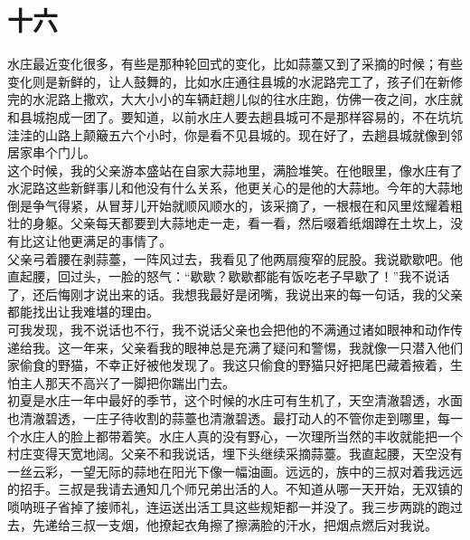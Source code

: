 \fancyhead[RO]{\thepage} %
\fancyhead[LE]{\thepage} %
\fancyfoot[LE,RO]{}
\fancyfoot[LO,CE]{}
\fancyfoot[CO,RE]{}
\chapter*{十六}
水庄最近变化很多，有些是那种轮回式的变化，比如蒜薹又到了采摘的时候；有些变化则是新鲜的，让人鼓舞的，比如水庄通往县城的水泥路完工了，孩子们在新修完的水泥路上撒欢，大大小小的车辆赶趟儿似的往水庄跑，仿佛一夜之间，水庄就和县城抱成一团了。要知道，以前水庄人要去趟县城可不是那样容易的，不在坑坑洼洼的山路上颠簸五六个小时，你是看不见县城的。现在好了，去趟县城就像到邻居家串个门儿。\\

这个时候，我的父亲游本盛站在自家大蒜地里，满脸堆笑。在他眼里，像水庄有了水泥路这些新鲜事儿和他没有什么关系，他更关心的是他的大蒜地。今年的大蒜地倒是争气得紧，从冒芽儿开始就顺风顺水的，该采摘了，一根根在和风里炫耀着粗壮的身躯。父亲每天都要到大蒜地走一走，看一看，然后啜着纸烟蹲在土坎上，没有比这让他更满足的事情了。\\

父亲弓着腰在剥蒜薹，一阵风过去，我看见了他两扇瘦窄的屁股。我说歇歇吧。他直起腰，回过头，一脸的怒气：“歇歇？歇歇都能有饭吃老子早歇了！”我不说话了，还后悔刚才说出来的话。我想我最好是闭嘴，我说出来的每一句话，我的父亲都能找出让我难堪的理由。\\

可我发现，我不说话也不行，我不说话父亲也会把他的不满通过诸如眼神和动作传递给我。这一年来，父亲看我的眼神总是充满了疑问和警惕，我就像一只潜入他们家偷食的野猫，不幸正好被他发现了。我这只偷食的野猫只好把尾巴藏着掖着，生怕主人那天不高兴了一脚把你踹出门去。\\

初夏是水庄一年中最好的季节，这个时候的水庄可有生机了，天空清澈碧透，水面也清澈碧透，一庄子待收割的蒜薹也清澈碧透。最打动人的不管你走到哪里，每一个水庄人的脸上都带着笑。水庄人真的没有野心，一次理所当然的丰收就能把一个村庄变得天宽地阔。父亲不和我说话，埋下头继续采摘蒜薹。我直起腰，天空没有一丝云彩，一望无际的蒜地在阳光下像一幅油画。远远的，族中的三叔对着我远远的招手。三叔是我请去通知几个师兄弟出活的人。不知道从哪一天开始，无双镇的唢呐班子省掉了接师礼，连运送出活工具这些规矩都一并没了。我三步两跳的跑过去，先递给三叔一支烟，他撩起衣角擦了擦满脸的汗水，把烟点燃后对我说。\\

